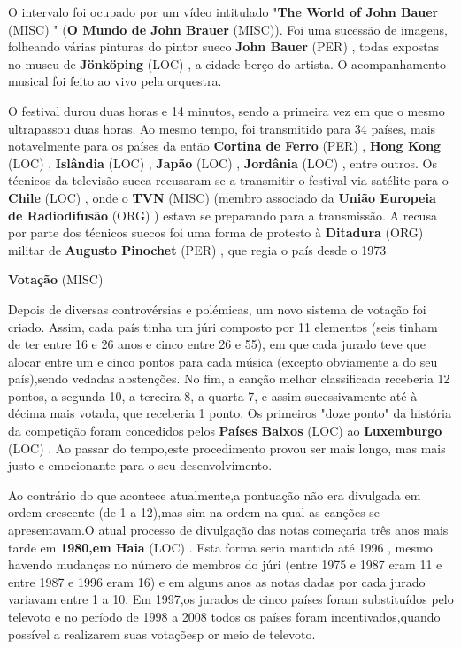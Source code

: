 \documentclass[12pt,a4paper]{article}
\begin{document}
O intervalo foi ocupado por um vídeo intitulado "\textbf{The World of John Bauer} (MISC) " (\textbf{O Mundo de John Brauer} (MISC)). Foi uma sucessão de imagens, folheando várias pinturas do pintor sueco \textbf{John Bauer} (PER) , todas expostas no museu de \textbf{Jönköping} (LOC) , a cidade berço do artista. O acompanhamento musical foi feito ao vivo pela orquestra.

O festival durou duas horas e 14 minutos, sendo a primeira vez em que o mesmo ultrapassou duas horas. Ao mesmo tempo, foi transmitido para 34 países, mais notavelmente para os países da então \textbf{Cortina de Ferro} (PER) , \textbf{Hong Kong} (LOC) , \textbf{Islândia} (LOC) , \textbf{Japão} (LOC) , \textbf{Jordânia} (LOC) , entre outros. Os técnicos da televisão sueca recusaram-se a transmitir o festival via satélite para o \textbf{Chile} (LOC) , onde o \textbf{TVN} (MISC) (membro associado da \textbf{União Europeia de Radiodifusão} (ORG) ) estava se preparando para a transmissão. A recusa por parte dos técnicos suecos foi uma forma de protesto à \textbf{Ditadura} (ORG) militar de \textbf{Augusto Pinochet} (PER) , que regia o país desde o 1973



\textbf{Votação} (MISC)

Depois de diversas controvérsias e polémicas, um novo sistema de votação foi criado. Assim, cada país tinha um júri composto por 11 elementos (seis tinham de ter entre 16 e 26 anos e cinco entre 26 e 55), em que cada jurado teve que alocar entre um e cinco pontos para cada música (excepto obviamente a do seu país),sendo vedadas abstenções. No fim, a canção melhor classificada receberia 12 pontos, a segunda 10, a terceira 8, a quarta 7, e assim sucessivamente até à décima mais votada, que receberia 1 ponto. Os primeiros "doze ponto" da história da competição foram concedidos pelos \textbf{Países Baixos} (LOC) ao \textbf{Luxemburgo} (LOC) . Ao passar do tempo,este procedimento provou ser mais longo, mas mais justo e emocionante para o seu desenvolvimento.

Ao contrário do que acontece atualmente,a pontuação não era divulgada em ordem crescente (de 1 a 12),mas sim na ordem na qual as canções se apresentavam.O atual processo de divulgação das notas começaria três anos mais tarde em \textbf{1980,em Haia} (LOC) . Esta forma seria mantida até 1996 , mesmo havendo mudanças no número de membros do júri (entre 1975 e 1987 eram 11 e entre 1987 e 1996 eram 16) e em alguns anos as notas dadas por cada jurado variavam entre 1 a 10. Em 1997,os jurados de cinco países foram substituídos pelo televoto e no período de 1998 a 2008 todos os países foram incentivados,quando possível a realizarem suas votaçõesp or meio de televoto.
\end{document}
